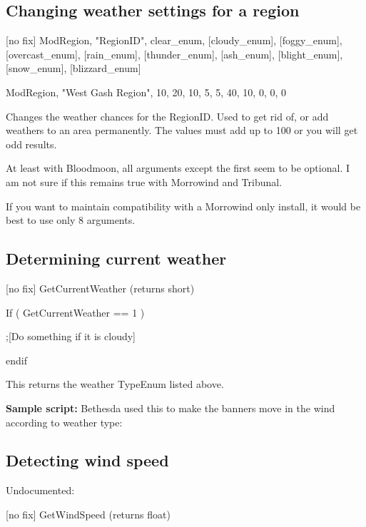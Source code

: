 \documentclass[
]{article}
\begin{document}
\hypertarget{changing-weather-settings-for-a-region}{%
\subsection{Changing weather settings for a
region}\label{changing-weather-settings-for-a-region}}

{[}no fix{]} ModRegion, "RegionID", clear\_enum, {[}cloudy\_enum{]},
{[}foggy\_enum{]}, {[}overcast\_enum{]}, {[}rain\_enum{]},
{[}thunder\_enum{]}, {[}ash\_enum{]}, {[}blight\_enum{]},
{[}snow\_enum{]}, {[}blizzard\_enum{]}

ModRegion, "West Gash Region", 10, 20, 10, 5, 5, 40, 10, 0, 0, 0

Changes the weather chances for the RegionID. Used to get rid of, or add
weathers to an area permanently. The values must add up to 100 or you
will get odd results.

At least with Bloodmoon, all arguments except the first seem to be
optional. I am not sure if this remains true with Morrowind and
Tribunal.

If you want to maintain compatibility with a Morrowind only install, it
would be best to use only 8 arguments.

\hypertarget{determining-current-weather}{%
\subsection{Determining current
weather}\label{determining-current-weather}}

{[}no fix{]} GetCurrentWeather (returns short)

If ( GetCurrentWeather == 1 )

;{[}Do something if it is cloudy{]}

endif

This returns the weather TypeEnum listed above.

\textbf{Sample script:} Bethesda used this to make the banners move in
the wind according to weather type:



\hypertarget{detecting-wind-speed}{%
\subsection{Detecting wind speed}\label{detecting-wind-speed}}

Undocumented:

{[}no fix{]} GetWindSpeed (returns float)
\end{document}
